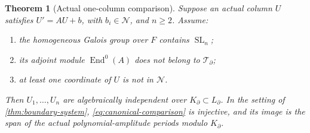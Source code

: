\documentclass[11pt]{article}
\numberwithin{equation}{section}
\newtheorem{theorem}{Theorem}[section]
\theoremstyle{definition}
\theoremstyle{remark}
\newcommand{\End}{\operatorname{End}}
\newcommand{\SL}{\operatorname{SL}}
\newcommand{\Ncal}{\mathcal N}
\newcommand{\Tcal}{\mathcal T}
\begin{document}
\begin{theorem}[Actual one-column comparison]
\label{thm:criterion}
Suppose an actual column $U$ satisfies $U'=AU+b$, with $b_i\in\Ncal$,
and $n\ge2$. Assume:
\begin{enumerate}
\item the homogeneous Galois group over $F$ contains $\SL_n$;
\item its adjoint module $\End^0(A)$ does not belong to $\Tcal_\partial$;
\item at least one coordinate of $U$ is not in $\Ncal$.
\end{enumerate}
Then $U_1,\ldots,U_n$ are algebraically independent over
$K_\partial\subset L_\partial$. In the setting of
\cref{thm:boundary-system}, \eqref{eq:canonical-comparison} is injective,
and its image is the span of the actual polynomial-amplitude periods
modulo $K_\partial$.
\end{theorem}
\end{document}
